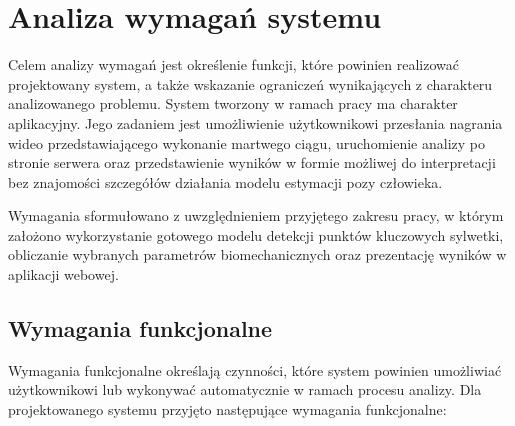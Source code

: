 \section{Analiza wymagań systemu}

Celem analizy wymagań jest określenie funkcji, które powinien realizować projektowany system, a także wskazanie ograniczeń wynikających z charakteru analizowanego problemu. System tworzony w ramach pracy ma charakter aplikacyjny. Jego zadaniem jest umożliwienie użytkownikowi przesłania nagrania wideo przedstawiającego wykonanie martwego ciągu, uruchomienie analizy po stronie serwera oraz przedstawienie wyników w formie możliwej do interpretacji bez znajomości szczegółów działania modelu estymacji pozy człowieka.

Wymagania sformułowano z uwzględnieniem przyjętego zakresu pracy, w którym założono wykorzystanie gotowego modelu detekcji punktów kluczowych sylwetki, obliczanie wybranych parametrów biomechanicznych oraz prezentację wyników w aplikacji webowej.

\subsection{Wymagania funkcjonalne}

Wymagania funkcjonalne określają czynności, które system powinien umożliwiać użytkownikowi lub wykonywać automatycznie w ramach procesu analizy. Dla projektowanego systemu przyjęto następujące wymagania funkcjonalne:

